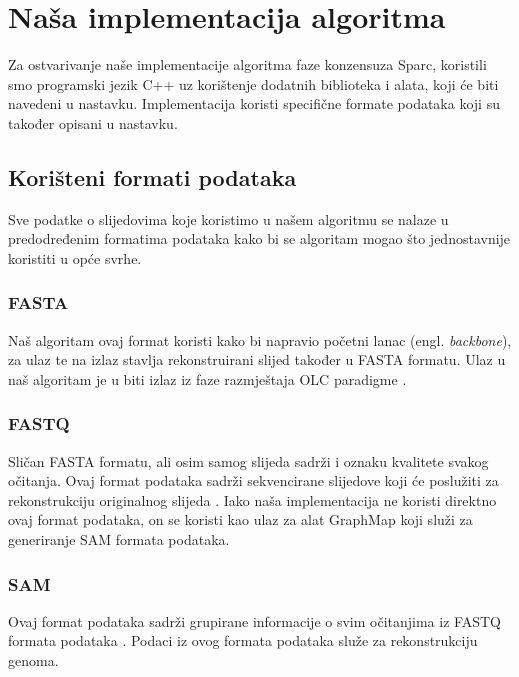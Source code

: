 \documentclass[times, utf8, seminar, numeric]{fer}
\begin{document}

\chapter{Naša implementacija algoritma}
Za ostvarivanje naše implementacije algoritma faze konzensuza Sparc, koristili smo programski jezik C++ uz korištenje dodatnih biblioteka i alata, koji će biti navedeni u nastavku. Implementacija koristi specifične formate podataka koji su također opisani u nastavku.
\section{Korišteni formati podataka}
Sve podatke o slijedovima koje koristimo u našem algoritmu se nalaze u predodređenim formatima podataka kako bi se algoritam mogao što jednostavnije koristiti u opće svrhe. 
\subsection{FASTA}
Naš algoritam ovaj format koristi kako bi napravio početni lanac (engl. \emph{backbone}), za ulaz te na izlaz stavlja rekonstruirani slijed također u FASTA formatu.
Ulaz u naš algoritam je u biti izlaz iz faze razmještaja OLC paradigme \cite[Poglavlje~1.3.1]{sikic2013bioinformatika}.
\subsection{FASTQ}
Sličan FASTA formatu, ali osim samog slijeda sadrži i oznaku kvalitete svakog očitanja.
Ovaj format podataka sadrži sekvencirane slijedove koji će poslužiti za rekonstrukciju originalnog slijeda \cite[Poglavlje~1.3.2]{sikic2013bioinformatika} .
Iako naša implementacija ne koristi direktno ovaj format podataka, on se koristi kao ulaz za alat GraphMap koji služi za generiranje SAM formata podataka. 
\subsection{SAM}
Ovaj format podataka sadrži grupirane informacije o svim očitanjima iz FASTQ formata podataka \cite{sam_format}. Podaci iz ovog formata podataka služe za rekonstrukciju genoma. 
\end{document}
